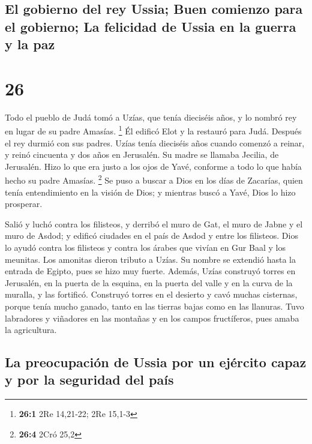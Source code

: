 \hypertarget{el-gobierno-del-rey-ussia-buen-comienzo-para-el-gobierno-la-felicidad-de-ussia-en-la-guerra-y-la-paz}{%
\subsection{El gobierno del rey Ussia; Buen comienzo para el gobierno;
La felicidad de Ussia en la guerra y la
paz}\label{el-gobierno-del-rey-ussia-buen-comienzo-para-el-gobierno-la-felicidad-de-ussia-en-la-guerra-y-la-paz}}

\hypertarget{section-25}{%
\section{26}\label{section-25}}

 Todo el pueblo de Judá tomó a Uzías, que tenía dieciséis
años, y lo nombró rey en lugar de su padre Amasías. \footnote{\textbf{26:1}
  2Re 14,21-22; 2Re 15,1-3}  Él edificó Elot y la restauró
para Judá. Después el rey durmió con sus padres.  Uzías
tenía dieciséis años cuando comenzó a reinar, y reinó cincuenta y dos
años en Jerusalén. Su madre se llamaba Jecilia, de Jerusalén.
 Hizo lo que era justo a los ojos de Yavé, conforme a todo
lo que había hecho su padre Amasías. \footnote{\textbf{26:4} 2Cró 25,2}
 Se puso a buscar a Dios en los días de Zacarías, quien
tenía entendimiento en la visión de Dios; y mientras buscó a Yavé, Dios
lo hizo prosperar.

 Salió y luchó contra los filisteos, y derribó el muro de
Gat, el muro de Jabne y el muro de Asdod; y edificó ciudades en el país
de Asdod y entre los filisteos.  Dios lo ayudó contra los
filisteos y contra los árabes que vivían en Gur Baal y los meunitas.
 Los amonitas dieron tributo a Uzías. Su nombre se
extendió hasta la entrada de Egipto, pues se hizo muy fuerte.
 Además, Uzías construyó torres en Jerusalén, en la puerta
de la esquina, en la puerta del valle y en la curva de la muralla, y las
fortificó.  Construyó torres en el desierto y cavó muchas
cisternas, porque tenía mucho ganado, tanto en las tierras bajas como en
las llanuras. Tuvo labradores y viñadores en las montañas y en los
campos fructíferos, pues amaba la agricultura.

\hypertarget{la-preocupaciuxf3n-de-ussia-por-un-ejuxe9rcito-capaz-y-por-la-seguridad-del-pauxeds}{%
\subsection{La preocupación de Ussia por un ejército capaz y por la
seguridad del
país}\label{la-preocupaciuxf3n-de-ussia-por-un-ejuxe9rcito-capaz-y-por-la-seguridad-del-pauxeds}}

